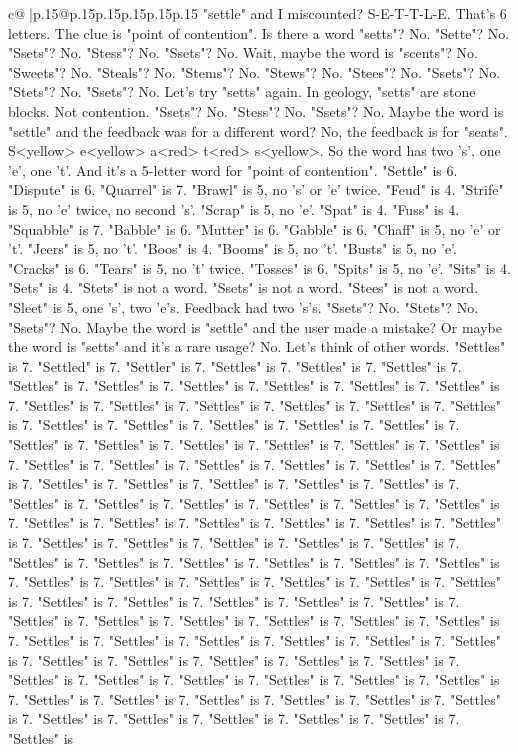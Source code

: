 \documentclass{article}
\begin{document}
{\begin{supertabular}{c@{$\;$}|p{.15\linewidth}@{}p{.15\linewidth}p{.15\linewidth}p{.15\linewidth}p{.15\linewidth}p{.15\linewidth}}
{{{"settle" and I miscounted? S{-}E{-}T{-}T{-}L{-}E. That's 6 letters. The clue is "point of contention". Is there a word "setts"? No. "Sette"? No. "Ssets"? No. "Stess"? No. "Ssets"? No. Wait, maybe the word is "scents"? No. "Sweets"? No. "Steals"? No. "Stems"? No. "Stews"? No. "Stees"? No. "Ssets"? No. "Stets"? No. "Ssets"? No. Let's try "setts" again. In geology, "setts" are stone blocks. Not contention. "Ssets"? No. "Stess"? No. "Ssets"? No. Maybe the word is "settle" and the feedback was for a different word? No, the feedback is for "seats". S<yellow> e<yellow> a<red> t<red> s<yellow>. So the word has two 's', one 'e', one 't'. And it's a 5{-}letter word for "point of contention". "Settle" is 6. "Dispute" is 6. "Quarrel" is 7. "Brawl" is 5, no 's' or 'e' twice. "Feud" is 4. "Strife" is 5, no 'e' twice, no second 's'. "Scrap" is 5, no 'e'. "Spat" is 4. "Fuss" is 4. "Squabble" is 7. "Babble" is 6. "Mutter" is 6. "Gabble" is 6. "Chaff" is 5, no 'e' or 't'. "Jeers" is 5, no 't'. "Boos" is 4. "Booms" is 5, no 't'. "Busts" is 5, no 'e'. "Cracks" is 6. "Tears" is 5, no 't' twice. "Tosses" is 6. "Spits" is 5, no 'e'. "Sits" is 4. "Sets" is 4. "Stets" is not a word. "Ssets" is not a word. "Stees" is not a word. "Sleet" is 5, one 's', two 'e's. Feedback had two 's's. "Ssets"? No. "Stets"? No. "Ssets"? No. Maybe the word is "settle" and the user made a mistake? Or maybe the word is "setts" and it's a rare usage? No. Let's think of other words. "Settles" is 7. "Settled" is 7. "Settler" is 7. "Settles" is 7. "Settles" is 7. "Settles" is 7. "Settles" is 7. "Settles" is 7. "Settles" is 7. "Settles" is 7. "Settles" is 7. "Settles" is 7. "Settles" is 7. "Settles" is 7. "Settles" is 7. "Settles" is 7. "Settles" is 7. "Settles" is 7. "Settles" is 7. "Settles" is 7. "Settles" is 7. "Settles" is 7. "Settles" is 7. "Settles" is 7. "Settles" is 7. "Settles" is 7. "Settles" is 7. "Settles" is 7. "Settles" is 7. "Settles" is 7. "Settles" is 7. "Settles" is 7. "Settles" is 7. "Settles" is 7. "Settles" is 7. "Settles" is 7. "Settles" is 7. "Settles" is 7. "Settles" is 7. "Settles" is 7. "Settles" is 7. "Settles" is 7. "Settles" is 7. "Settles" is 7. "Settles" is 7. "Settles" is 7. "Settles" is 7. "Settles" is 7. "Settles" is 7. "Settles" is 7. "Settles" is 7. "Settles" is 7. "Settles" is 7. "Settles" is 7. "Settles" is 7. "Settles" is 7. "Settles" is 7. "Settles" is 7. "Settles" is 7. "Settles" is 7. "Settles" is 7. "Settles" is 7. "Settles" is 7. "Settles" is 7. "Settles" is 7. "Settles" is 7. "Settles" is 7. "Settles" is 7. "Settles" is 7. "Settles" is 7. "Settles" is 7. "Settles" is 7. "Settles" is 7. "Settles" is 7. "Settles" is 7. "Settles" is 7. "Settles" is 7. "Settles" is 7. "Settles" is 7. "Settles" is 7. "Settles" is 7. "Settles" is 7. "Settles" is 7. "Settles" is 7. "Settles" is 7. "Settles" is 7. "Settles" is 7. "Settles" is 7. "Settles" is 7. "Settles" is 7. "Settles" is 7. "Settles" is 7. "Settles" is 7. "Settles" is 7. "Settles" is 7. "Settles" is 7. "Settles" is 7. "Settles" is 7. "Settles" is 7. "Settles" is 7. "Settles" is 7. "Settles" is 7. "Settles" is 7. "Settles" is 7. "Settles" is 7. "Settles" is 7. "Settles" is 7. "Settles" is 7. "Settles" is }}}
\end{supertabular}}
\end{document}
